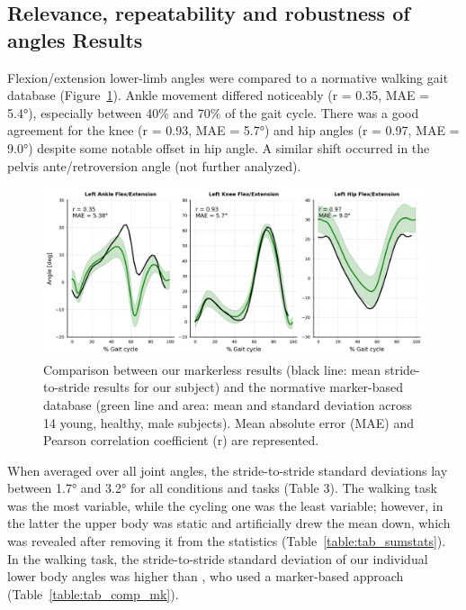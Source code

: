 \subsection{Relevance, repeatability and robustness of angles Results}

Flexion/extension lower-limb angles were compared to a normative walking gait database \cite{Trinler2019} (Figure~\ref{fig_compnorm}). Ankle movement differed noticeably (r = 0.35, MAE = 5.4°), especially between 40\% and 70\% of the gait cycle. There was a good agreement for the knee (r = 0.93, MAE = 5.7°) and hip angles (r = 0.97, MAE = 9.0°) despite some notable offset in hip angle. A similar shift occurred in the pelvis ante/retroversion angle (not further analyzed).

\begin{figure}[!ht]
	\centering
	\def\svgwidth{1\columnwidth}
	\fontsize{10pt}{10pt}\selectfont
	\includegraphics[width=\linewidth]{"../Chap4/Figures/Fig_CompNorm.png"}
	\caption{Comparison between our markerless results (black line: mean stride-to-stride results for our subject) and the normative marker-based database (green line and area: mean and standard deviation across 14 young, healthy, male subjects). Mean absolute error (MAE) and Pearson correlation coefficient (r) are represented.}
	\label{fig_compnorm}
\end{figure}

When averaged over all joint angles, the stride-to-stride standard deviations lay between 1.7° and 3.2° for all conditions and tasks (Table 3). The walking task was the most variable, while the cycling one was the least variable; however, in the latter the upper body was static and artificially drew the mean down, which was revealed after removing it from the statistics (Table~\ref{table:tab_sumstats}). In the walking task, the stride-to-stride standard deviation of our individual lower body angles was higher than \cite{Kang2008}, who used a marker-based approach (Table~\ref{table:tab_comp_mk}).

